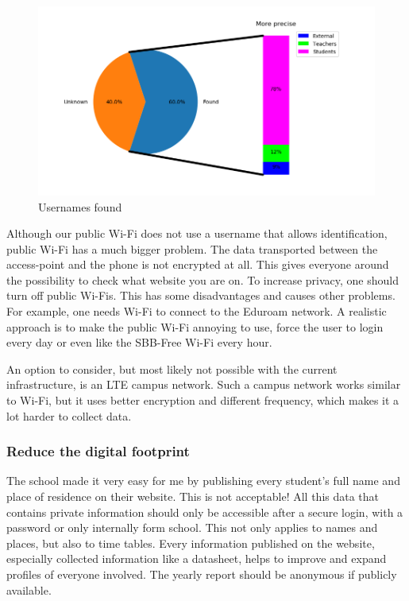 \documentclass[paper=a4, fontsize=11pt]{article}
\begin{document}
\begin{figure}
\centering
\includegraphics [width = 12cm]{images/piecharwith_usernames.png}
\caption{Usernames found \label{usernames}}
\end{figure}

Although our public Wi-Fi does not use a username that allows identification, public Wi-Fi has a much bigger problem. The data transported between the access-point and the phone is not encrypted at all. This gives everyone around the possibility to check what website you are on. To increase privacy, one should turn off public Wi-Fis. This has some disadvantages and causes other problems. For example, one needs Wi-Fi to connect to the Eduroam network. A realistic approach is to make the public Wi-Fi annoying to use, force the user to login every day or even like the SBB-Free Wi-Fi every hour.



An option to consider, but most likely not possible with the current infrastructure, is an LTE campus network.
Such a campus network works similar to Wi-Fi, but it uses better encryption and different frequency, which makes it a lot harder to collect data.

\subsubsection{Reduce the digital footprint}

The school made it very easy for me by publishing every student's full name and place of residence on their website. This is not acceptable! All this data that contains private information should only be accessible after a secure login, with a password or only internally form school. This not only applies to names and places, but also to time tables. Every information published on the website, especially collected information like a datasheet, helps to improve and expand profiles of everyone involved. The yearly report should be anonymous if publicly available.
\end{document}
